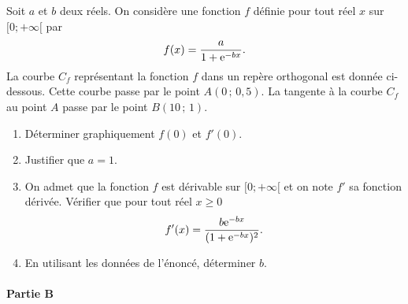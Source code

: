 \documentclass[11pt,fleqn, openany]{book} %
\begin{document}
\begin{exercise}[subtitle={(Antilles - Guyane 2019)}]
Soit $a$ et $b$ deux réels. On considère une fonction $f$ définie pour tout réel $x$ sur $[0;+\infty[$ par
\[f(x)=\dfrac{a}{1+\mathrm{e}^{-bx}}.\]
La courbe $C_f$ représentant la fonction $f$ dans un repère orthogonal est donnée ci-dessous. Cette courbe passe par le point $A(0\, ;\, 0,5)$.
La tangente à la courbe $C_f$ au point $A$ passe par le point $B(10\,;\,1)$.
\vskip10pt
\begin{center}
\end{center}
\vskip10pt
\begin{enumerate}
\item Déterminer graphiquement $f(0)$ et $f'(0)$.
\item Justifier que $a=1$.
\item On admet que la fonction $f$ est dérivable sur $[0;+\infty[$ et on note $f'$ sa fonction dérivée. Vérifier que pour tout réel $x\geqslant 0$
\[f'(x)=\dfrac{b\mathrm{e}^{-bx}}{(1+\mathrm{e}^{-bx})^2}.\]
\item En utilisant les données de l'énoncé, déterminer $b$.
\end{enumerate}

\paragraph{Partie B}	


\end{exercise}
\end{document}
